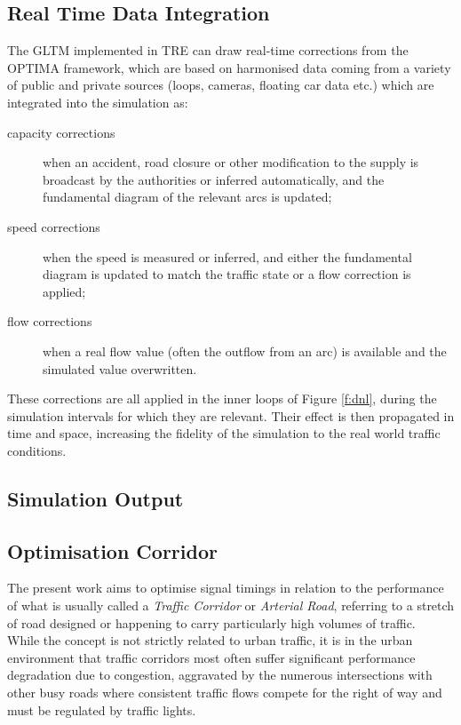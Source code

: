 \subsection{Real Time Data Integration}
The GLTM implemented in TRE can draw real-time corrections from the OPTIMA framework, which are based on harmonised data coming from a variety of public and private sources (loops, cameras, floating car data etc.) which are integrated into the simulation as:
\begin{description}
\item[capacity corrections] when an accident, road closure or other modification to the supply is broadcast by the authorities or inferred automatically, and the fundamental diagram of the relevant arcs is updated;
\item[speed corrections] when the speed is measured or inferred, and either the fundamental diagram is updated to match the traffic state or a flow correction is applied;
\item[flow corrections] when a real flow value (often the outflow from an arc) is available and the simulated value overwritten.
\end{description}

These corrections are all applied in the inner loops of Figure \ref{f:dnl}, during the simulation intervals for which they are relevant. Their effect is then propagated in time and space, increasing the fidelity of the simulation to the real world traffic conditions.


\subsection{Simulation Output} \label{s:output}


\subsection{Optimisation Corridor}
The present work aims to optimise signal timings in relation to the performance of what is usually called a \emph{Traffic Corridor} or \emph{Arterial Road}, referring to a stretch of road designed or happening to carry particularly high volumes of traffic. \\
While the concept is not strictly related to urban traffic, it is in the urban environment that traffic corridors most often suffer significant performance degradation due to congestion, aggravated by the numerous intersections with other busy roads where consistent traffic flows compete for the right of way and must be regulated by traffic lights.

